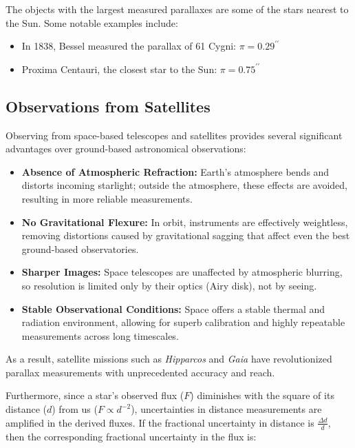\vspace{-1.3em}
\begin{observationblock}
The objects with the largest measured parallaxes are some of the stars nearest to the Sun. Some notable examples include:

\begin{itemize}
    \item In 1838, Bessel measured the parallax of 61 Cygni: $\pi = 0.29^{\prime\prime}$
    \item Proxima Centauri, the closest star to the Sun: $\pi = 0.75^{\prime\prime}$
\end{itemize}
\end{observationblock}

\subsection{Observations from Satellites}

Observing from space-based telescopes and satellites provides several significant advantages over ground-based astronomical observations:

\begin{itemize}
    \item \textbf{Absence of Atmospheric Refraction:} Earth's atmosphere bends and distorts incoming starlight; outside the atmosphere, these effects are avoided, resulting in more reliable measurements.
    \item \textbf{No Gravitational Flexure:} In orbit, instruments are effectively weightless, removing distortions caused by gravitational sagging that affect even the best ground-based observatories.
    \item \textbf{Sharper Images:} Space telescopes are unaffected by atmospheric blurring, so resolution is limited only by their optics (Airy disk), not by seeing.
    \item \textbf{Stable Observational Conditions:} Space offers a stable thermal and radiation environment, allowing for superb calibration and highly repeatable measurements across long timescales.
\end{itemize}

As a result, satellite missions such as \textit{Hipparcos} and \textit{Gaia} have revolutionized parallax measurements with unprecedented accuracy and reach.

Furthermore, since a star's observed flux ($F$) diminishes with the square of its distance ($d$) from us ($ F \propto d^{-2} $), uncertainties in distance measurements are amplified in the derived fluxes. If the fractional uncertainty in distance is $\frac{\Delta d}{d}$, then the corresponding fractional uncertainty in the flux is:


